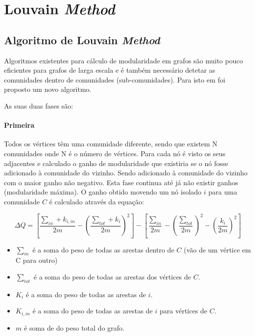 
\renewcommand{\algorithmicrequire}{\textbf{Input: }}
\renewcommand{\algorithmicensure}{\textbf{Output: }}

\section{Louvain \textit{Method}}

\subsection{Algoritmo de Louvain \textit{Method}}
Algoritmos existentes para cálculo de modularidade em grafos são muito pouco eficientes para grafos de larga escala e é também necessário detetar as comunidades dentro de comunidades (sub-comunidades). Para isto em \cite{louvainDoc} foi proposto um novo algoritmo.

As suas duas fases são:

\paragraph{Primeira}
Todos os vértices têm uma comunidade diferente, sendo que existem N comunidades onde N é o número de vértices.
Para cada nó é visto os seus adjacentes e calculado o ganho de modularidade que existiria se o nó fosse adicionado à comunidade do vizinho. Sendo adicionado à comunidade do vizinho com o maior ganho não negativo. Esta fase continua até já não existir ganhos (modularidade máxima).
O ganho obtido movendo um nó isolado $i$ para uma comunidade $C$ é calculado através da equação:


\begin{equation}
\label{eq:GND}
 \Delta Q  =  [\frac{\sum_{in} + k_{i,in}}{2m} - (\frac{\sum_{tot} +k_i}{2m})^2] - [\frac{\sum_{in}}{2m} - (\frac{\sum_{tot}}{2m})^2 - (\frac{k_i}{2m})^2] 
\end{equation}

\begin{itemize}
	\item $\sum_{in}$ é a soma do peso de todas as arestas dentro de $C$ (vão de um vértice em C para outro)
	\item $\sum_{tot}$ é a soma do peso de todas as arestas dos vértices de $C$. %
	\item $K_i$ é a soma do peso de todas as arestas de $i$. %
	\item $K_{i,in}$ é a soma do peso de todas as arestas de $i$ para vértices de $C$.
	\item $m$ é soma de do peso total do grafo.
\end{itemize}

